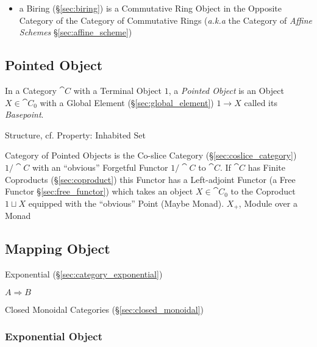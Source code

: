 \begin{itemize}
  \item a Biring (\S\ref{sec:biring}) is a Commutative Ring Object in the
    Opposite Category of the Category of Commutative Rings
    (\emph{a.k.a} the Category of \emph{Affine Schemes}
    \S\ref{sec:affine_scheme})
\end{itemize}



\subsection{Pointed Object}\label{sec:pointed_object}

In a Category $\cat{C}$ with a Terminal Object $1$, a \emph{Pointed Object} is
an Object $X \in \cat{C}_0$ with a Global Element (\S\ref{sec:global_element})
$1 \rightarrow X$ called its \emph{Basepoint}.

Structure, cf. Property: Inhabited Set %

Category of Pointed Objects is the Co-slice Category
(\S\ref{sec:coslice_category}) $1/\cat{C}$ with an ``obvious'' Forgetful
Functor $1 / \cat{C}$ to $\cat{C}$. If $\cat{C}$ has Finite Coproducts
(\S\ref{sec:coproduct}) this Functor has a Left-adjoint Functor (a Free Functor
\S\ref{sec:free_functor}) which takes an object $X \in \cat{C}_0$ to the
Coproduct $1 \sqcup X$ equipped with the ``obvious'' Point (Maybe Monad).
$X_+$, Module over a Monad %



\subsection{Mapping Object}\label{sec:mapping_object}

Exponential (\S\ref{sec:category_exponential})

$A \Rightarrow B$

Closed Monoidal Categories (\S\ref{sec:closed_monoidal})



\subsubsection{Exponential Object}\label{sec:exponential_object}

